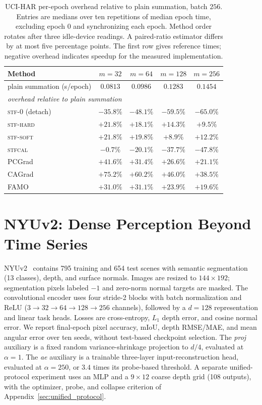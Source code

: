 \documentclass{article}
\begin{document}
\begin{table}[t]
\centering
\caption{UCI-HAR per-epoch overhead relative to plain summation, batch $256$. Entries are medians over ten repetitions of median epoch time, excluding epoch 0 and synchronizing each epoch. Method order rotates after three idle-device readings. A paired-ratio estimator differs by at most five percentage points. The first row gives reference times; negative overhead indicates speedup for the measured implementation.}
\label{tab:overhead}
\footnotesize
\begin{tabular}{lcccc}
\toprule
Method & $m{=}32$ & $m{=}64$ & $m{=}128$ & $m{=}256$ \\
\midrule
plain summation (s/epoch) & $0.0813$ & $0.0986$ & $0.1283$ & $0.1454$ \\
\midrule
\multicolumn{5}{l}{\itshape overhead relative to plain summation} \\
\midrule
\textsc{stf-0} (detach) & $-35.8\%$ & $-48.1\%$ & $-59.5\%$ & $-65.0\%$ \\
\textsc{stf-hard} & $+21.8\%$ & $+18.1\%$ & $+14.3\%$ & $+9.5\%$ \\
\textsc{stf-soft} & $+21.8\%$ & $+19.8\%$ & $+8.9\%$ & $+12.2\%$ \\
\textsc{stfcal} & $-0.7\%$ & $-20.1\%$ & $-37.7\%$ & $-47.8\%$ \\
PCGrad & $+41.6\%$ & $+31.4\%$ & $+26.6\%$ & $+21.1\%$ \\
CAGrad & $+75.2\%$ & $+60.2\%$ & $+46.0\%$ & $+38.5\%$ \\
FAMO & $+31.0\%$ & $+31.1\%$ & $+23.9\%$ & $+19.6\%$ \\
\bottomrule
\end{tabular}
\end{table}


\section{NYUv2: Dense Perception Beyond Time Series}\label{app:nyu}

NYUv2~\citep{silberman2012indoor,ladicky2014pulling} contains 795 training and 654 test scenes with semantic segmentation (13 classes), depth, and surface normals. Images are resized to $144\times192$; segmentation pixels labeled $-1$ and zero-norm normal targets are masked. The convolutional encoder uses four stride-2 blocks with batch normalization and ReLU ($3\to32\to64\to128\to256$ channels), followed by a $d=128$ representation and linear task heads. Losses are cross-entropy, $L_1$ depth error, and cosine normal error. We report final-epoch pixel accuracy, mIoU, depth RMSE/MAE, and mean angular error over ten seeds, without test-based checkpoint selection. The \emph{proj} auxiliary is a fixed random variance-shrinkage projection to $d/4$, evaluated at $\alpha=1$. The \emph{ae} auxiliary is a trainable three-layer input-reconstruction head, evaluated at $\alpha=250$, or $3.4$ times its probe-based threshold. A separate unified-protocol experiment uses an MLP and a $9\times12$ coarse depth grid (108 outputs), with the optimizer, probe, and collapse criterion of Appendix~\ref{sec:unified_protocol}.
\end{document}
